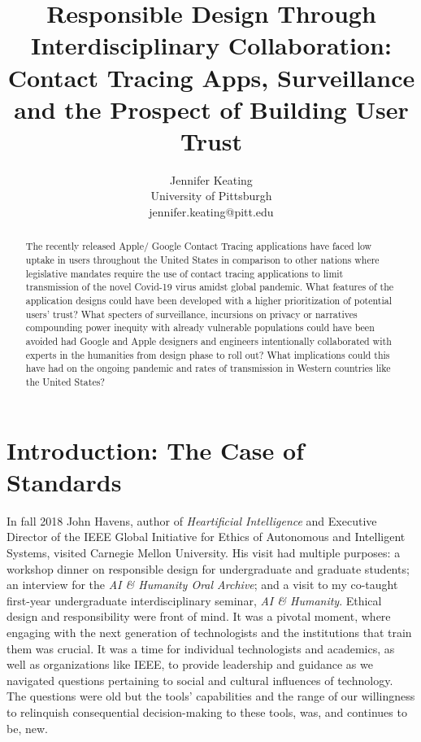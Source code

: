 \documentclass[11pt,dvipdfm]{article}
\begin{document}
\title{Responsible Design Through Interdisciplinary Collaboration:  Contact Tracing Apps, Surveillance \\and the Prospect of Building User Trust }
\author{Jennifer Keating\\University of Pittsburgh\\jennifer.keating@pitt.edu}


\maketitle
\begin{abstract}
The recently released Apple/ Google Contact Tracing applications have faced low uptake in users throughout the United States in comparison to other nations where legislative mandates require the use of contact tracing applications to limit transmission of the novel Covid-19 virus amidst global pandemic.  What features of the application designs could have been developed with a higher prioritization of potential users’ trust?  What specters of surveillance, incursions on privacy or narratives compounding power inequity with already vulnerable populations could have been avoided had Google and Apple designers and engineers intentionally collaborated with experts in the humanities from design phase to roll out?  What implications could this have had on the ongoing pandemic and rates of transmission in Western countries like the United States?
\end{abstract}

\section{Introduction:  The Case of Standards}

In fall 2018 John Havens, author of \emph{Heartificial Intelligence} and Executive Director of the IEEE Global Initiative for Ethics of Autonomous and Intelligent Systems, visited Carnegie Mellon University.  His visit had multiple purposes:  a workshop dinner on responsible design for undergraduate and graduate students; an interview for the \emph{AI \& Humanity Oral Archive}; and a visit to my co-taught first-year undergraduate interdisciplinary seminar, \emph{AI \& Humanity}.  Ethical design and responsibility were front of mind. It was a pivotal moment, where engaging with the next generation of technologists and the institutions that train them was crucial.  It was a time for individual technologists and academics, as well as organizations like IEEE, to provide leadership and guidance as we navigated questions pertaining to social and cultural influences of technology.  The questions were old but the tools’ capabilities and the range of our willingness to relinquish consequential decision-making to these tools, was, and continues to be, new.   
\end{document}
